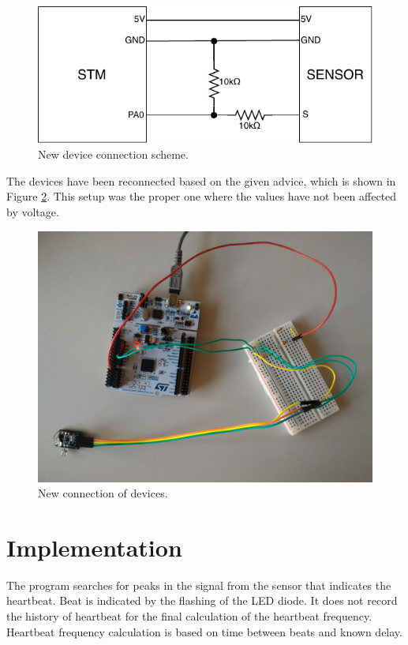 \documentclass[11pt,a4paper]{article}
\begin{document}
\begin{figure}[H]
    \centering
    \includegraphics[scale=1.4]{img/new_con_scheme.pdf}
    \caption{New device connection scheme.}
    \label{fig:new_con_scheme}
\end{figure}

The devices have been reconnected based on the given advice, which is shown in Figure \ref{fig:new_dev_con}. This setup was the proper one where the values have not been affected by voltage.

\begin{figure}[H]
    \centering
    \includegraphics[scale=0.1]{img/setup2.jpg}
    \caption{New connection of devices.}
    \label{fig:new_dev_con}
\end{figure}

\newpage

\section{Implementation}
The program searches for peaks in the signal from the sensor that indicates the heartbeat. Beat is indicated by the flashing of the LED diode. It does not record the history of heartbeat for the final calculation of the heartbeat frequency. Heartbeat frequency calculation is based on time between beats and known delay.
\end{document}
